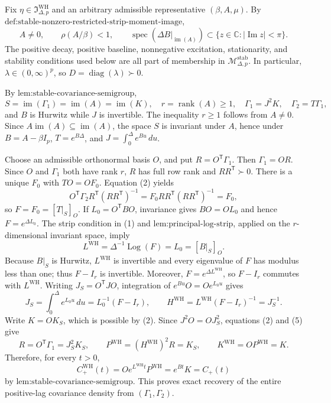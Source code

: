 Fix \(\eta\in\mathfrak I_{\Delta,p}^{\mathrm{WH}}\) and an arbitrary admissible representative \((\beta,A,\mu)\).  By \(\text{def:stable-nonzero-restricted-strip-moment-image}\),
\[
 A\neq0,\qquad \rho(A/\beta)<1,\qquad
 \operatorname{spec}\!\left(\left.\Delta B\right|_{\operatorname{im}(A)}\right)
 \subset\{z\in\mathbb C:|\operatorname{Im}z|<\pi\}.
\tag{1}
\]
The positive decay, positive baseline, nonnegative excitation, stationarity, and stability conditions used below are all part of membership in \(\mathcal M_{\Delta,p}^{\mathrm{stab}}\).  In particular, \(\lambda\in(0,\infty)^p\), so \(D=\operatorname{diag}(\lambda)\succ0\).

By \(\text{lem:stable-covariance-semigroup}\),
\[
 S=\operatorname{im}(\Gamma_1)=\operatorname{im}(A)=\operatorname{im}(K),\quad
 r=\operatorname{rank}(A)\geq1,\quad
 \Gamma_1=J^2K,\quad \Gamma_2=T\Gamma_1,
\tag{2}
\]
and \(B\) is Hurwitz while \(J\) is invertible.  The inequality \(r\geq1\) follows from \(A\neq0\).  Since \(A\operatorname{im}(A)\subseteq\operatorname{im}(A)\), the space \(S\) is invariant under \(A\), hence under \(B=A-\beta I_p\), \(T=e^{B\Delta}\), and \(J=\int_0^\Delta e^{Bu}\,du\).

Choose an admissible orthonormal basis \(O\), and put \(R=O^{\mathsf T}\Gamma_1\).  Then \(\Gamma_1=OR\).  Since \(O\) and \(\Gamma_1\) both have rank \(r\), \(R\) has full row rank and \(RR^{\mathsf T}\succ0\).  There is a unique \(F_0\) with \(TO=OF_0\).  Equation (2) yields
\[
 O^{\mathsf T}\Gamma_2R^{\mathsf T}(RR^{\mathsf T})^{-1}
 =F_0RR^{\mathsf T}(RR^{\mathsf T})^{-1}=F_0,
\tag{3}
\]
so \(F=F_0=[T|_S]_O\).  If \(L_0=O^{\mathsf T}BO\), invariance gives \(BO=OL_0\) and hence \(F=e^{\Delta L_0}\).  The strip condition in (1) and \(\text{lem:principal-log-strip}\), applied on the \(r\)-dimensional invariant space, imply
\[
 L^{\mathrm{WH}}=\Delta^{-1}\operatorname{Log}(F)=L_0=[B|_S]_O.
\tag{4}
\]
Because \(B|_S\) is Hurwitz, \(L^{\mathrm{WH}}\) is invertible and every eigenvalue of \(F\) has modulus less than one; thus \(F-I_r\) is invertible.  Moreover, \(F=e^{\Delta L^{\mathrm{WH}}}\), so \(F-I_r\) commutes with \(L^{\mathrm{WH}}\).  Writing \(J_S=O^{\mathsf T}JO\), integration of \(e^{Bu}O=Oe^{L_0u}\) gives
\[
 J_S=\int_0^\Delta e^{L_0u}\,du
 =L_0^{-1}(F-I_r),\qquad
 H^{\mathrm{WH}}=L^{\mathrm{WH}}(F-I_r)^{-1}=J_S^{-1}.
\tag{5}
\]
Write \(K=OK_S\), which is possible by (2).  Since \(J^2O=OJ_S^2\), equations (2) and (5) give
\[
 R=O^{\mathsf T}\Gamma_1=J_S^2K_S,\qquad
 P^{\mathrm{WH}}=(H^{\mathrm{WH}})^2R=K_S,\qquad
 K^{\mathrm{WH}}=OP^{\mathrm{WH}}=K.
\tag{6}
\]
Therefore, for every \(t>0\),
\[
 C_{+}^{\mathrm{WH}}(t)=Oe^{L^{\mathrm{WH}}t}P^{\mathrm{WH}}
 =e^{Bt}K=C_{+}(t)
\tag{7}
\]
by \(\text{lem:stable-covariance-semigroup}\).  This proves exact recovery of the entire positive-lag covariance density from \((\Gamma_1,\Gamma_2)\).

